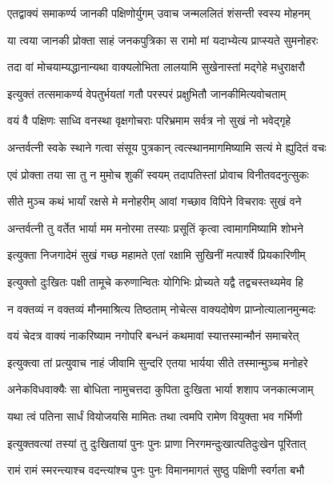\twolineshloka
{एतद्वाक्यं समाकर्ण्य जानकी पक्षिणोर्युगम्}
{उवाच जन्मललितं शंसन्ती स्वस्य मोहनम्}%

\twolineshloka
{या त्वया जानकी प्रोक्ता साहं जनकपुत्रिका}
{स रामो मां यदाभ्येत्य प्राप्स्यते सुमनोहरः}%

\twolineshloka
{तदा वां मोचयाम्यद्धानान्यथा वाक्यलोभिता}
{लालयामि सुखेनास्तां मद्गेहे मधुराक्षरौ}%

\twolineshloka
{इत्युक्तं तत्समाकर्ण्य वेपतुर्भयतां गतौ}
{परस्परं प्रक्षुभितौ जानकीमित्यवोचताम्}%

\twolineshloka
{वयं वै पक्षिणः साध्वि वनस्था वृक्षगोचराः}
{परिभ्रमाम सर्वत्र नो सुखं नो भवेद्गृहे}%

\twolineshloka
{अन्तर्वत्नी स्वके स्थाने गत्वा संसूय पुत्रकान्}
{त्वत्स्थानमागमिष्यामि सत्यं मे ह्युदितं वचः}%

\twolineshloka
{एवं प्रोक्ता तया सा तु न मुमोच शुकीं स्वयम्}
{तदापतिस्तां प्रोवाच विनीतवदनुत्सुकः}%

\twolineshloka
{सीते मुञ्च कथं भार्यां रक्षसे मे मनोहरीम्}
{आवां गच्छाव विपिने विचरावः सुखं वने}%

\twolineshloka
{अन्तर्वत्नी तु वर्तेत भार्या मम मनोरमा}
{तस्याः प्रसूतिं कृत्वा त्वामागमिष्यामि शोभने}%

\twolineshloka
{इत्युक्ता निजगादेमं सुखं गच्छ महामते}
{एतां रक्षामि सुखिनीं मत्पार्श्वे प्रियकारिणीम्}%

\twolineshloka
{इत्युक्तो दुःखितः पक्षी तामूचे करुणान्वितः}
{योगिभिः प्रोच्यते यद्वै तद्वचस्तथ्यमेव हि}%

\twolineshloka
{न वक्तव्यं न वक्तव्यं मौनमाश्रित्य तिष्ठताम्}
{नोचेत्स वाक्यदोषेण प्राप्नोत्यालानमुन्मदः}%

\twolineshloka
{वयं चेदत्र वाक्यं नाकरिष्याम नगोपरि}
{बन्धनं कथमावां स्यात्तस्मान्मौनं समाचरेत्}%

\twolineshloka
{इत्युक्त्वा तां प्रत्युवाच नाहं जीवामि सुन्दरि}
{एतया भार्यया सीते तस्मान्मुञ्च मनोहरे}%

\twolineshloka
{अनेकविधवाक्यैः सा बोधिता नामुचत्तदा}
{कुपिता दुःखिता भार्या शशाप जनकात्मजाम्}%

\twolineshloka
{यथा त्वं पतिना सार्धं वियोजयसि मामितः}
{तथा त्वमपि रामेण वियुक्ता भव गर्भिणी}%

\twolineshloka
{इत्युक्तवत्यां तस्यां तु दुःखितायां पुनः पुनः}
{प्राणा निरगमन्दुःखात्पतिदुःखेन पूरितात्}%

\twolineshloka
{रामं रामं स्मरन्त्याश्च वदन्त्यांश्च पुनः पुनः}
{विमानमागतं सुष्ठु पक्षिणी स्वर्गता बभौ}%

